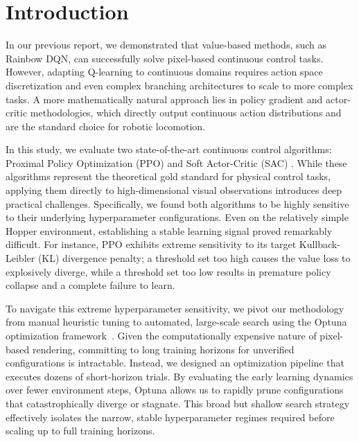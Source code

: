 

\section{Introduction}
\label{sec:intro}

In our previous report, we demonstrated that value-based methods, such as Rainbow DQN, can successfully solve pixel-based continuous control tasks. However, adapting Q-learning to continuous domains requires action space discretization and even complex branching architectures to scale to more complex tasks. A more mathematically natural approach lies in policy gradient and actor-critic methodologies, which directly output continuous action distributions and are the standard choice for robotic locomotion. 

In this study, we evaluate two state-of-the-art continuous control algorithms: Proximal Policy Optimization (PPO) \cite{schulman2017ppo} and Soft Actor-Critic (SAC) \cite{haarnoja2018soft}. While these algorithms represent the theoretical gold standard for physical control tasks, applying them directly to high-dimensional visual observations introduces deep practical challenges. Specifically, we found both algorithms to be highly sensitive to their underlying hyperparameter configurations. Even on the relatively simple Hopper environment, establishing a stable learning signal proved remarkably difficult. For instance, PPO exhibits extreme sensitivity to its target Kullback-Leibler (KL) divergence penalty; a threshold set too high causes the value loss to explosively diverge, while a threshold set too low results in premature policy collapse and a complete failure to learn.

To navigate this extreme hyperparameter sensitivity, we pivot our methodology from manual heuristic tuning to automated, large-scale search using the Optuna optimization framework~\cite{akiba2019optuna}. Given the computationally expensive nature of pixel-based rendering, committing to long training horizons for unverified configurations is intractable. Instead, we designed an optimization pipeline that executes dozens of short-horizon trials. By evaluating the early learning dynamics over fewer environment steps, Optuna allows us to rapidly prune configurations that catastrophically diverge or stagnate. This broad but shallow search strategy effectively isolates the narrow, stable hyperparameter regimes required before scaling up to full training horizons.